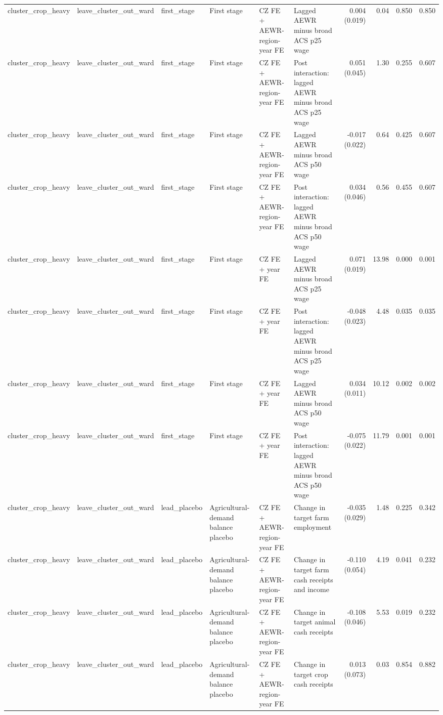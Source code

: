 \begin{tabular}{llllllrrrr}
cluster_crop_heavy & leave_cluster_out_ward & first_stage & First stage & CZ FE + AEWR-region-year FE & Lagged AEWR minus broad ACS p25 wage & 0.004 (0.019) & 0.04 & 0.850 & 0.850 \\
cluster_crop_heavy & leave_cluster_out_ward & first_stage & First stage & CZ FE + AEWR-region-year FE & Post interaction: lagged AEWR minus broad ACS p25 wage & 0.051 (0.045) & 1.30 & 0.255 & 0.607 \\
cluster_crop_heavy & leave_cluster_out_ward & first_stage & First stage & CZ FE + AEWR-region-year FE & Lagged AEWR minus broad ACS p50 wage & -0.017 (0.022) & 0.64 & 0.425 & 0.607 \\
cluster_crop_heavy & leave_cluster_out_ward & first_stage & First stage & CZ FE + AEWR-region-year FE & Post interaction: lagged AEWR minus broad ACS p50 wage & 0.034 (0.046) & 0.56 & 0.455 & 0.607 \\
cluster_crop_heavy & leave_cluster_out_ward & first_stage & First stage & CZ FE + year FE & Lagged AEWR minus broad ACS p25 wage & 0.071 (0.019) & 13.98 & 0.000 & 0.001 \\
cluster_crop_heavy & leave_cluster_out_ward & first_stage & First stage & CZ FE + year FE & Post interaction: lagged AEWR minus broad ACS p25 wage & -0.048 (0.023) & 4.48 & 0.035 & 0.035 \\
cluster_crop_heavy & leave_cluster_out_ward & first_stage & First stage & CZ FE + year FE & Lagged AEWR minus broad ACS p50 wage & 0.034 (0.011) & 10.12 & 0.002 & 0.002 \\
cluster_crop_heavy & leave_cluster_out_ward & first_stage & First stage & CZ FE + year FE & Post interaction: lagged AEWR minus broad ACS p50 wage & -0.075 (0.022) & 11.79 & 0.001 & 0.001 \\
cluster_crop_heavy & leave_cluster_out_ward & lead_placebo & Agricultural-demand balance placebo & CZ FE + AEWR-region-year FE & Change in target farm employment & -0.035 (0.029) & 1.48 & 0.225 & 0.342 \\
cluster_crop_heavy & leave_cluster_out_ward & lead_placebo & Agricultural-demand balance placebo & CZ FE + AEWR-region-year FE & Change in target farm cash receipts and income & -0.110 (0.054) & 4.19 & 0.041 & 0.232 \\
cluster_crop_heavy & leave_cluster_out_ward & lead_placebo & Agricultural-demand balance placebo & CZ FE + AEWR-region-year FE & Change in target animal cash receipts & -0.108 (0.046) & 5.53 & 0.019 & 0.232 \\
cluster_crop_heavy & leave_cluster_out_ward & lead_placebo & Agricultural-demand balance placebo & CZ FE + AEWR-region-year FE & Change in target crop cash receipts & 0.013 (0.073) & 0.03 & 0.854 & 0.882 \\

\end{tabular}
